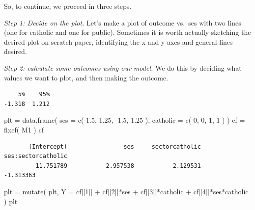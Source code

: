 \documentclass[
  letterpaper,
  DIV=11,
  numbers=noendperiod]{scrreprt}
\newenvironment{Shaded}{\begin{snugshade}}{\end{snugshade}}
\newcommand{\AttributeTok}[1]{\textcolor[rgb]{0.49,0.56,0.16}{#1}}
\newcommand{\DecValTok}[1]{\textcolor[rgb]{0.25,0.63,0.44}{#1}}
\newcommand{\FloatTok}[1]{\textcolor[rgb]{0.25,0.63,0.44}{#1}}
\newcommand{\FunctionTok}[1]{\textcolor[rgb]{0.02,0.16,0.49}{#1}}
\newcommand{\NormalTok}[1]{\textcolor[rgb]{0.00,0.44,0.13}{#1}}
\newcommand{\OtherTok}[1]{\textcolor[rgb]{0.00,0.44,0.13}{#1}}
\newcommand{\SpecialCharTok}[1]{\textcolor[rgb]{0.25,0.44,0.63}{#1}}
\begin{document}
So, to continue, we proceed in three steps.

\emph{Step 1: Decide on the plot.} Let's make a plot of outcome vs.~ses
with two lines (one for catholic and one for public). Sometimes it is
worth actually sketching the desired plot on scratch paper, identifying
the x and y axes and general lines desired.

\emph{Step 2: calculate some outcomes using our model.} We do this by
deciding what values we want to plot, and then making the outcome.

\begin{Shaded}
\end{Shaded}

\begin{verbatim}
    5%    95% 
-1.318  1.212 
\end{verbatim}

\begin{Shaded}
\begin{Highlighting}[]
\NormalTok{plt }\OtherTok{=} \FunctionTok{data.frame}\NormalTok{( }\AttributeTok{ses =} \FunctionTok{c}\NormalTok{(}\SpecialCharTok{{-}}\FloatTok{1.5}\NormalTok{, }\FloatTok{1.25}\NormalTok{, }\SpecialCharTok{{-}}\FloatTok{1.5}\NormalTok{, }\FloatTok{1.25}\NormalTok{ ),}
                  \AttributeTok{catholic =} \FunctionTok{c}\NormalTok{( }\DecValTok{0}\NormalTok{, }\DecValTok{0}\NormalTok{, }\DecValTok{1}\NormalTok{, }\DecValTok{1}\NormalTok{ ) )}
\NormalTok{cf }\OtherTok{=} \FunctionTok{fixef}\NormalTok{( M1 )}
\NormalTok{cf}
\end{Highlighting}
\end{Shaded}

\begin{verbatim}
       (Intercept)                ses     sectorcatholic ses:sectorcatholic 
         11.751789           2.957538           2.129531          -1.313363 
\end{verbatim}

\begin{Shaded}
\begin{Highlighting}[]
\NormalTok{plt }\OtherTok{=} \FunctionTok{mutate}\NormalTok{( plt,}
              \AttributeTok{Y =}\NormalTok{ cf[[}\DecValTok{1}\NormalTok{]] }\SpecialCharTok{+}\NormalTok{ cf[[}\DecValTok{2}\NormalTok{]]}\SpecialCharTok{*}\NormalTok{ses }\SpecialCharTok{+}\NormalTok{ cf[[}\DecValTok{3}\NormalTok{]]}\SpecialCharTok{*}\NormalTok{catholic }\SpecialCharTok{+}\NormalTok{ cf[[}\DecValTok{4}\NormalTok{]]}\SpecialCharTok{*}\NormalTok{ses}\SpecialCharTok{*}\NormalTok{catholic )}
\NormalTok{plt}
\end{Highlighting}
\end{Shaded}
\end{document}
